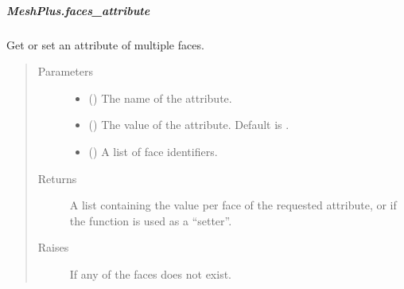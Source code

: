 \documentclass[letterpaper,10pt,english]{sphinxmanual}
\begin{document}
\begin{fulllineitems}
\begin{fulllineitems}
\begin{quote}
\begin{description}
\end{description}\end{quote}

\end{fulllineitems}



\subparagraph{MeshPlus.faces\_attribute}
\label{\detokenize{api/generated/directional_clustering.mesh.MeshPlus.faces_attribute:meshplus-faces-attribute}}\label{\detokenize{api/generated/directional_clustering.mesh.MeshPlus.faces_attribute::doc}}

\begin{fulllineitems}
\label{\detokenize{api/generated/directional_clustering.mesh.MeshPlus.faces_attribute:directional_clustering.mesh.MeshPlus.faces_attribute}}
Get or set an attribute of multiple faces.
\begin{quote}\begin{description}
\item[{Parameters}] \leavevmode\begin{itemize}
\item {} 
 () \textendash{} The name of the attribute.

\item {} 
 () \textendash{} The value of the attribute.
Default is .

\item {} 
 () \textendash{} A list of face identifiers.

\end{itemize}

\item[{Returns}] \leavevmode
{} \textendash{} A list containing the value per face of the requested attribute,
or  if the function is used as a “setter”.

\item[{Raises}] \leavevmode
{} \textendash{} If any of the faces does not exist.


\end{description}
\end{quote}
\end{fulllineitems}
\end{fulllineitems}
\end{document}
